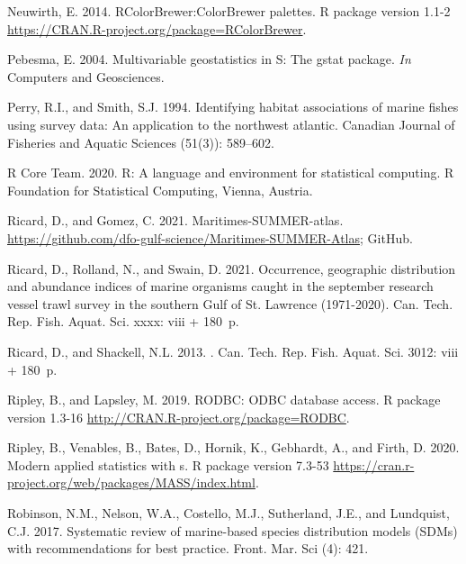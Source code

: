 \documentclass[12pt]{article}\usepackage[]{graphicx}\usepackage[]{color}
\begin{document}
\begin{CSLReferences}{1}{0}
\leavevmode\hypertarget{ref-R:package:RColorBrewer}{}%
Neuwirth, E. 2014. RColorBrewer:ColorBrewer palettes. R package version 1.1-2 \url{https://CRAN.R-project.org/package=RColorBrewer}.

\leavevmode\hypertarget{ref-R:package:gstat}{}%
Pebesma, E. 2004. Multivariable geostatistics in {S}: The gstat package. \emph{In} Computers and Geosciences.

\leavevmode\hypertarget{ref-Perry:Smith:1994:cjfas}{}%
Perry, R.I., and Smith, S.J. 1994. Identifying habitat associations of marine fishes using survey data: An application to the northwest atlantic. Canadian Journal of Fisheries and Aquatic Sciences (51(3)): 589--602.

\leavevmode\hypertarget{ref-R:2020}{}%
R Core Team. 2020. R: A language and environment for statistical computing. R Foundation for Statistical Computing, Vienna, Austria.

\leavevmode\hypertarget{ref-Ricard-Gomez-2021}{}%
Ricard, D., and Gomez, C. 2021. Maritimes-SUMMER-atlas. \url{https://github.com/dfo-gulf-science/Maritimes-SUMMER-Atlas}; GitHub.

\leavevmode\hypertarget{ref-Ricard:GULFatlas:2021}{}%
Ricard, D., Rolland, N., and Swain, D. 2021. Occurrence, geographic distribution and abundance indices of marine organisms caught in the september research vessel trawl survey in the southern {G}ulf of {S}t. {L}awrence (1971-2020). Can. Tech. Rep. Fish. Aquat. Sci. xxxx: viii + 180~p.

\leavevmode\hypertarget{ref-Ricard:MARatlas:2013}{}%
Ricard, D., and Shackell, N.L. 2013. . Can. Tech. Rep. Fish. Aquat. Sci. 3012: viii + 180~p.

\leavevmode\hypertarget{ref-R:package:RODBC}{}%
Ripley, B., and Lapsley, M. 2019. RODBC: ODBC database access. R package version 1.3-16 \url{http://CRAN.R-project.org/package=RODBC}.

\leavevmode\hypertarget{ref-R:package:MASS}{}%
Ripley, B., Venables, B., Bates, D., Hornik, K., Gebhardt, A., and Firth, D. 2020. Modern applied statistics with s. R package version 7.3-53 \url{https://cran.r-project.org/web/packages/MASS/index.html}.

\leavevmode\hypertarget{ref-Robinson:2017}{}%
Robinson, N.M., Nelson, W.A., Costello, M.J., Sutherland, J.E., and Lundquist, C.J. 2017. Systematic review of marine-based species distribution models ({SDM}s) with recommendations for best practice. Front. Mar. Sci (4): 421.


\end{CSLReferences}
\end{document}
